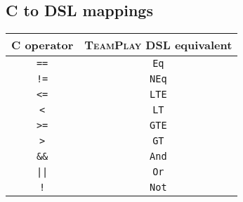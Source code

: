     \subsection{C to DSL mappings}
        \begin{tabular}{c | c}
            \textbf{C operator} &   \textsc{TeamPlay} \textbf{DSL equivalent}   \\
            \hline
            \texttt{==}         &   \texttt{Eq}     \\
            \texttt{!=}         &   \texttt{NEq}    \\
            \texttt{<=}         &   \texttt{LTE}    \\
            \texttt{<}          &   \texttt{LT}     \\
            \texttt{>=}         &   \texttt{GTE}    \\
            \texttt{>}          &   \texttt{GT}     \\
            \texttt{\&\&}       &   \texttt{And}    \\
            \texttt{||}         &   \texttt{Or}     \\
            \texttt{!}          &   \texttt{Not}
        \end{tabular}
    
